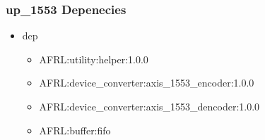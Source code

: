 \subsubsection{up\_1553 Depenecies}
\begin{itemize}
\item dep
	\begin{itemize}
	\item AFRL:utility:helper:1.0.0
	\item AFRL:device\_converter:axis\_1553\_encoder:1.0.0
	\item AFRL:device\_converter:axis\_1553\_dencoder:1.0.0
	\item AFRL:buffer:fifo
	\end{itemize}
\end{itemize}
